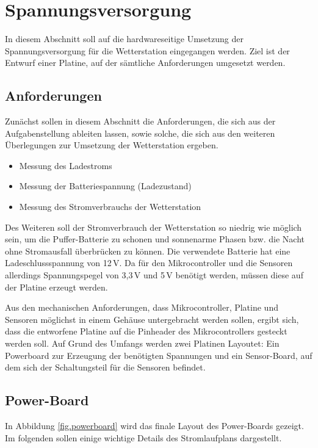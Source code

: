 \section{Spannungsversorgung}\label{sec.spannungsversorgung}
In diesem Abschnitt soll auf die hardwareseitige Umsetzung der Spannungsversorgung für die Wetterstation eingegangen werden. Ziel ist der Entwurf einer Platine, auf der sämtliche Anforderungen umgesetzt werden.

\subsection{Anforderungen}\label{subsec.anforderungen}
Zunächst sollen in diesem Abschnitt die Anforderungen, die sich aus der Aufgabenstellung ableiten lassen, sowie solche, die sich aus den weiteren Überlegungen zur Umsetzung der Wetterstation ergeben.

\begin{itemize}

	\item Messung des Ladestroms
	\item Messung der Batteriespannung (Ladezustand)
	\item Messung des Stromverbrauchs der Wetterstation

\end{itemize}

Des Weiteren soll der Stromverbrauch der Wetterstation so niedrig wie möglich sein, um die Puffer-Batterie zu schonen und sonnenarme Phasen bzw. die Nacht ohne Stromausfall überbrücken zu können. Die verwendete Batterie hat eine Ladeschlussspannung von 12\,V. Da für den Mikrocontroller und die Sensoren allerdings Spannungspegel von 3,3\,V und 5\,V benötigt werden, müssen diese auf der Platine erzeugt werden.

Aus den mechanischen Anforderungen, dass Mikrocontroller, Platine und Sensoren möglichst in einem Gehäuse untergebracht werden sollen, ergibt sich, dass die entworfene Platine auf die Pinheader des Mikrocontrollers gesteckt werden soll. Auf Grund des Umfangs werden zwei Platinen Layoutet: Ein Powerboard zur Erzeugung der benötigten Spannungen und ein Sensor-Board, auf dem sich der Schaltungsteil für die Sensoren befindet.

\subsection{Power-Board}
In Abbildung \ref{fig.powerboard} wird das finale Layout des Power-Boards gezeigt. Im folgenden sollen einige wichtige Details des Stromlaufplans dargestellt.

